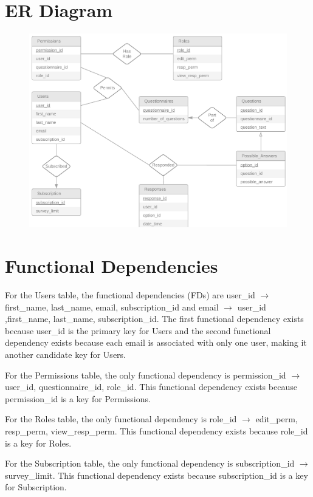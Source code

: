 \documentclass[12pt, oneside, a4paper]{article}
\begin{document}
    \section{ER Diagram}
    \FloatBarrier
    \begin{figure}[H] 
        \centerline{
        \includegraphics[width=\textwidth]{er_diagram.png}
        }
    \end{figure}
    \section{Functional Dependencies}
    For the Users table, the functional dependencies (FDs) are user\_id $\rightarrow$ first\_name, last\_name, email, subscription\_id and email $\rightarrow$ user\_id ,first\_name, last\_name, subscription\_id.
    The first functional dependency exists because user\_id is the primary key for Users and the second functional dependency exists because each email is associated with only one user, making it another candidate key for Users.

    For the Permissions table, the only functional dependency is permission\_id $\rightarrow$ user\_id, questionnaire\_id, role\_id.
    This functional dependency exists because permission\_id is a key for Permissions.

    For the Roles table, the only functional dependency is role\_id $\rightarrow$ edit\_perm, resp\_perm, view\_resp\_perm.
    This functional dependency exists because role\_id is a key for Roles.

    For the Subscription table, the only functional dependency is subscription\_id $\rightarrow$ survey\_limit.
    This functional dependency exists because subscription\_id is a key for Subscription.
\end{document}
